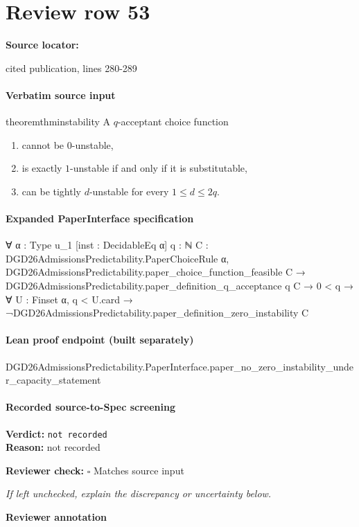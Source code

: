 \documentclass[10pt]{article}
\newcommand{\reviewerbox}{%
  \par\noindent\fbox{\parbox{0.96\linewidth}{\rule{0pt}{0.38in}}}\par
}
\newcommand{\reviewmatch}[1]{%
  \par\noindent\textbf{Reviewer check:} $\square$\; #1\par
  \noindent\emph{If left unchecked, explain the discrepancy or uncertainty below.}\par
}
\begin{document}
\section*{Review row 53}
\textbf{Source locator:} {\footnotesize\raggedright cited publication, lines 280-\allowbreak{}289\par}
\paragraph{Verbatim source input}
\begin{ReviewVerbatim}
\begin{restatable}{theorem}{thminstability}
\label{thm:instability}
A $q$-acceptant choice function
\begin{enumerate}
    \item cannot be $0$-unstable,
    \item  is exactly $1$-unstable if and only if it is substitutable,
    \item can be tightly $d$-unstable for every $1\leq d \leq 2q$.
\end{enumerate}

\end{restatable}%
\end{ReviewVerbatim}


\paragraph{Expanded PaperInterface specification}
\begin{ReviewVerbatim}
∀ {α : Type u_1} [inst : DecidableEq α] {q : ℕ} {C : DGD26AdmissionsPredictability.PaperChoiceRule α},
  DGD26AdmissionsPredictability.paper_choice_function_feasible C →
    DGD26AdmissionsPredictability.paper_definition_q_acceptance q C →
      0 < q → ∀ {U : Finset α}, q < U.card → ¬DGD26AdmissionsPredictability.paper_definition_zero_instability C
\end{ReviewVerbatim}

\paragraph{Lean proof endpoint (built separately)}\begin{ReviewVerbatim}
DGD26AdmissionsPredictability.PaperInterface.paper_no_zero_instability_under_capacity_statement
\end{ReviewVerbatim}

\paragraph{Recorded source-to-Spec screening}
\textbf{Verdict:} \texttt{not recorded}
\\
\textbf{Reason:} not recorded
\reviewmatch{Matches source input}
\noindent\textbf{Reviewer annotation}\par
\reviewerbox
\clearpage
\hypertarget{source-claim-4efb65f58e4bc480}{}
\end{document}
